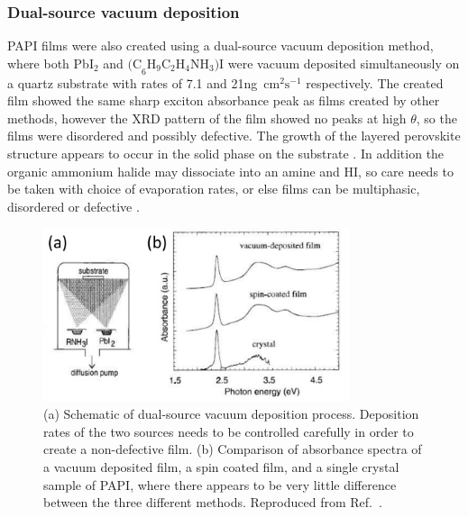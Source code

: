 \subsubsection{Dual-source vacuum deposition}
PAPI films were also created using a dual-source vacuum deposition method, where both Pb$\textrm{I}_2$ and $\textrm{(C}_6\textrm{H}_9\textrm{C}_2\textrm{H}_4\textrm{NH}_3)\textrm{I}$ were vacuum deposited simultaneously on a quartz substrate with rates of 7.1 and 21ng~$\textrm{cm}^2\textrm{s}^{-1}$ respectively. The created film showed the same sharp exciton absorbance peak as films created by other methods, however the XRD pattern of the film showed no peaks at high $\theta$, so the films were disordered and possibly defective. The growth of the layered perovskite structure appears to occur in the solid phase on the substrate \cite{Era1997}. In addition the organic ammonium halide may dissociate into an amine and HI, so care needs to be taken with choice of evaporation rates, or else films can be multiphasic, disordered or defective \cite{Mitzi1999}.
\begin{figure}[ht]
\centering
\includegraphics[width=0.8\textwidth]{Fig8}
\caption{(a) Schematic of dual-source vacuum deposition process. Deposition rates of the two sources needs to be controlled carefully in order to create a non-defective film. (b) Comparison of absorbance spectra of a vacuum deposited film, a spin coated film, and a single crystal sample of PAPI, where there appears to be very little difference between the three different methods. Reproduced from Ref.\ \cite{Era1997}.}
\label{2Fig8}
\end{figure}

